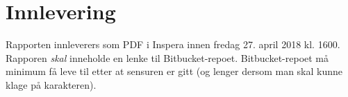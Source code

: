 \documentclass[11pt,a4paper]{article}
\begin{document}
\section{Innlevering}

Rapporten innleverers som PDF i Inspera innen fredag 27. april 2018
kl. 1600. Rapporen \emph{skal} inneholde en lenke til Bitbucket-repoet.
Bitbucket-repoet må minimum få leve til etter at sensuren er gitt (og
lenger dersom man skal kunne klage på karakteren).



\end{document}
